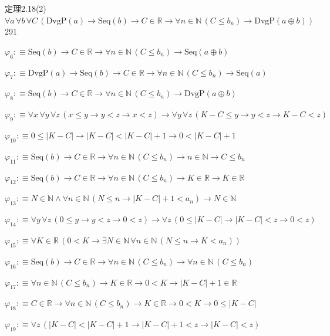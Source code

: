 \begin{fullproof}{定理2.18(2)}{$\forall a\,\forall b\,\forall C\,(\mathrm{DvgP}(a) \to \mathrm{Seq}(b) \to C \in \mathbb{R} \to \forall n \in \mathbb{N}\,(C \leq b_{n}) \to \mathrm{DvgP}(a \oplus b))$}{291}
\begin{abbrevlist}
\item $\varphi_{6} :\equiv \mathrm{Seq}(b) \to C \in \mathbb{R} \to \forall n \in \mathbb{N}\,(C \leq b_{n}) \to \mathrm{Seq}(a \oplus b)$
\item $\varphi_{7} :\equiv \mathrm{DvgP}(a) \to \mathrm{Seq}(b) \to C \in \mathbb{R} \to \forall n \in \mathbb{N}\,(C \leq b_{n}) \to \mathrm{Seq}(a)$
\item $\varphi_{8} :\equiv \mathrm{Seq}(b) \to C \in \mathbb{R} \to \forall n \in \mathbb{N}\,(C \leq b_{n}) \to \mathrm{DvgP}(a \oplus b)$
\item $\varphi_{9} :\equiv \forall x\,\forall y\,\forall z\,(x \leq y \to y < z \to x < z) \to \forall y\,\forall z\,(K - C \leq y \to y < z \to K - C < z)$
\item $\varphi_{10} :\equiv 0 \leq \lvert K - C \rvert \to \lvert K - C \rvert < \lvert K - C \rvert + 1 \to 0 < \lvert K - C \rvert + 1$
\item $\varphi_{11} :\equiv \mathrm{Seq}(b) \to C \in \mathbb{R} \to \forall n \in \mathbb{N}\,(C \leq b_{n}) \to n \in \mathbb{N} \to C \leq b_{n}$
\item $\varphi_{12} :\equiv \mathrm{Seq}(b) \to C \in \mathbb{R} \to \forall n \in \mathbb{N}\,(C \leq b_{n}) \to K \in \mathbb{R} \to K \in \mathbb{R}$
\item $\varphi_{13} :\equiv N \in \mathbb{N} \land \forall n \in \mathbb{N}\,(N \leq n \to \lvert K - C \rvert + 1 < a_{n}) \to N \in \mathbb{N}$
\item $\varphi_{14} :\equiv \forall y\,\forall z\,(0 \leq y \to y < z \to 0 < z) \to \forall z\,(0 \leq \lvert K - C \rvert \to \lvert K - C \rvert < z \to 0 < z)$
\item $\varphi_{15} :\equiv \forall K \in \mathbb{R}\,(0 < K \to \exists N \in \mathbb{N}\,\forall n \in \mathbb{N}\,(N \leq n \to K < a_{n}))$
\item $\varphi_{16} :\equiv \mathrm{Seq}(b) \to C \in \mathbb{R} \to \forall n \in \mathbb{N}\,(C \leq b_{n}) \to \forall n \in \mathbb{N}\,(C \leq b_{n})$
\item $\varphi_{17} :\equiv \forall n \in \mathbb{N}\,(C \leq b_{n}) \to K \in \mathbb{R} \to 0 < K \to \lvert K - C \rvert + 1 \in \mathbb{R}$
\item $\varphi_{18} :\equiv C \in \mathbb{R} \to \forall n \in \mathbb{N}\,(C \leq b_{n}) \to K \in \mathbb{R} \to 0 < K \to 0 \leq \lvert K - C \rvert$
\item $\varphi_{19} :\equiv \forall z\,(\lvert K - C \rvert < \lvert K - C \rvert + 1 \to \lvert K - C \rvert + 1 < z \to \lvert K - C \rvert < z)$

\end{abbrevlist}
\end{fullproof}
